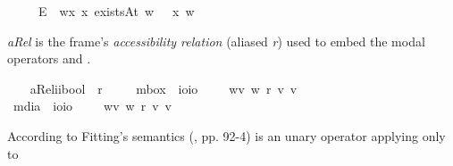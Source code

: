 \begin{isabellebody}
\ \ \ \ \ {\isachardoublequoteopen}\isactrlbold {\isasymexists}\isactrlsup E{\isasymPhi}\ {\isasymequiv}\ {\isasymlambda}w{\isachardot}{\isasymexists}x{\isachardot}\ {\isacharparenleft}x\ existsAt\ w{\isacharparenright}\ {\isasymand}\ {\isacharparenleft}{\isasymPhi}\ x\ w{\isacharparenright}{\isachardoublequoteclose}%
\begin{isamarkuptext}%
\emph{aRel} is the frame's \emph{accessibility relation} (aliased \emph{r}) used to embed the modal operators
\isa{{\isasymbox}} and \isa{{\isasymdiamond}}.%
\end{isamarkuptext}\isamarkuptrue%
\ \ \isamarkupfalse%
\ aRel{\isacharcolon}{\isacharcolon}{\isachardoublequoteopen}i{\isasymRightarrow}i{\isasymRightarrow}bool{\isachardoublequoteclose}\ {\isacharparenleft}\ {\isachardoublequoteopen}r{\isachardoublequoteclose}\ {}{}{\isacharparenright}\isanewline
\ \ \isamarkupfalse%
\ mbox\ {\isacharcolon}{\isacharcolon}\ {\isachardoublequoteopen}io{\isasymRightarrow}io{\isachardoublequoteclose}\ {\isacharparenleft}{\isachardoublequoteopen}\ \ {\isachardoublequoteopen}\isactrlbold {\isasymbox}{\isasymphi}\ {\isasymequiv}\ {\isasymlambda}w{\isachardot}{\isasymforall}v{\isachardot}\ {\isacharparenleft}w\ r\ v{\isacharparenright}{\isasymlongrightarrow}{\isacharparenleft}{\isasymphi}\ v{\isacharparenright}{\isachardoublequoteclose}\isanewline
\ \ \isamarkupfalse%
\ mdia\ {\isacharcolon}{\isacharcolon}\ {\isachardoublequoteopen}io{\isasymRightarrow}io{\isachardoublequoteclose}\ {\isacharparenleft}{\isachardoublequoteopen}\ \ {\isachardoublequoteopen}\isactrlbold {\isasymdiamond}{\isasymphi}\ {\isasymequiv}\ {\isasymlambda}w{\isachardot}{\isasymexists}v{\isachardot}\ {\isacharparenleft}w\ r\ v{\isacharparenright}{\isasymand}{\isacharparenleft}{\isasymphi}\ v{\isacharparenright}{\isachardoublequoteclose}%
\isamarkuptrue%
%
\begin{isamarkuptext}%
According to Fitting's semantics (\cite{Fitting}, pp. 92-4) \isa{{\isasymdown}} is an unary operator applying only to 

\end{isamarkuptext}
\end{isabellebody}
